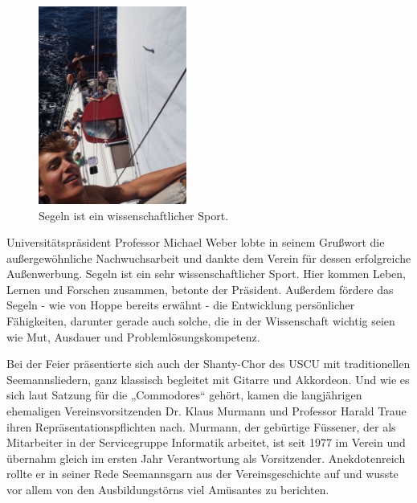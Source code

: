 \begin{figure} %
    \begin{center}
      \includegraphics[width=0.435\textwidth]{rohmaterial-bilder/segeln.jpg}
    \end{center}
    \caption[Segeltörn mit dem USCU]{Segeln ist ein \glq wissenschaftlicher Sport\grq.}
  \end{figure}

Universitätspräsident Professor Michael Weber lobte in seinem Grußwort die außergewöhnliche Nachwuchsarbeit und dankte dem Verein für dessen erfolgreiche Außenwerbung. \glqq Segeln ist ein sehr wissenschaftlicher Sport. Hier kommen Leben, Lernen und Forschen zusammen\grqq, betonte der Präsident. Außerdem fördere das Segeln - wie von Hoppe bereits erwähnt - die Entwicklung persönlicher Fähigkeiten, darunter gerade auch solche, die in der Wissenschaft wichtig seien wie Mut, Ausdauer und Problemlösungskompetenz. 

Bei der Feier präsentierte sich auch der Shanty-Chor des USCU mit traditionellen Seemannsliedern, ganz klassisch begleitet mit Gitarre und Akkordeon. Und wie es sich laut Satzung für die „Commodores“ gehört, kamen die langjährigen ehemaligen Vereinsvorsitzenden Dr. Klaus Murmann und Professor Harald Traue ihren Repräsentationspflichten nach. Murmann, der gebürtige Füssener, der als Mitarbeiter in der Servicegruppe Informatik arbeitet, ist seit 1977 im Verein und übernahm gleich im ersten Jahr Verantwortung als Vorsitzender. Anekdotenreich rollte er in seiner Rede Seemannsgarn aus der Vereinsgeschichte auf und wusste vor allem von den Ausbildungstörns viel Amüsantes zu berichten. 

